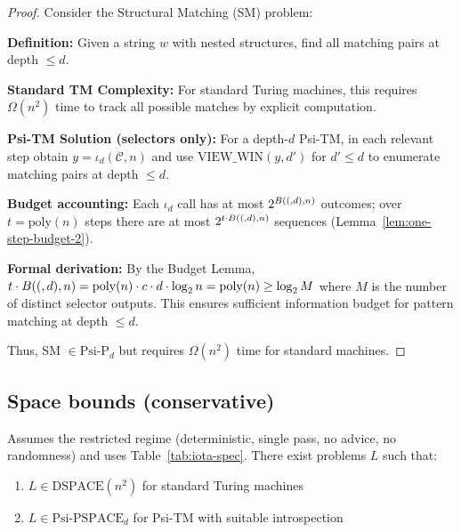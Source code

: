 \begin{proof}
Consider the Structural Matching (SM) problem:

\textbf{Definition:} Given a string $w$ with nested structures, find all matching pairs at depth $\leq d$.

\textbf{Standard TM Complexity:}
For standard Turing machines, this requires $\Omega(n^2)$ time to track all possible matches by explicit computation.

\textbf{Psi-TM Solution (selectors only):}
For a depth-$d$ Psi-TM, in each relevant step obtain $y=\iota_d(\mathcal{C},n)$ and use $\mathrm{VIEW\_WIN}(y,d')$ for $d'\le d$ to enumerate matching pairs at depth $\le d$.

\textbf{Budget accounting:}
Each $\iota_d$ call has at most $2^{B((,d),n)}$ outcomes; over $t=\mathrm{poly}(n)$ steps there are at most $2^{t \cdot B((,d),n)}$ sequences (Lemma~\ref{lem:one-step-budget-2}).

\textbf{Formal derivation:} By the Budget Lemma, $t \cdot \B(d,n) = \mathrm{poly}(n) \cdot c \cdot d \cdot \log n = \mathrm{poly}(n) \ge \log M$ where $M$ is the number of distinct selector outputs. This ensures sufficient information budget for pattern matching at depth $\le d$.

Thus, SM $\in \text{Psi-P}_d$ but requires $\Omega(n^2)$ time for standard machines.
\end{proof}

\subsection{Space bounds (conservative)}

\begin{theorem}
Assumes the restricted regime (deterministic, single pass, no advice, no randomness) and uses Table~\ref{tab:iota-spec}.
There exist problems $L$ such that:
\begin{enumerate}
\item $L \in \text{DSPACE}(n^2)$ for standard Turing machines
\item $L \in \text{Psi-PSPACE}_d$ for Psi-TM with suitable introspection
\end{enumerate}
\end{theorem}


